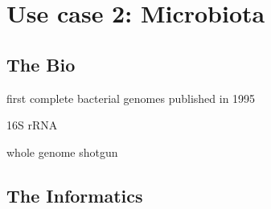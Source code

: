 \begin{center}
\begin{minipage}{5in}
\begin{center}
{}

\end{center}
\end{minipage}
\end{center}

\newpage


\section{Use case 2: Microbiota}


\subsection{The Bio}
first complete bacterial genomes published in 1995  \cite{land2015insights}

16S rRNA

whole genome shotgun

\subsection{The Informatics}

